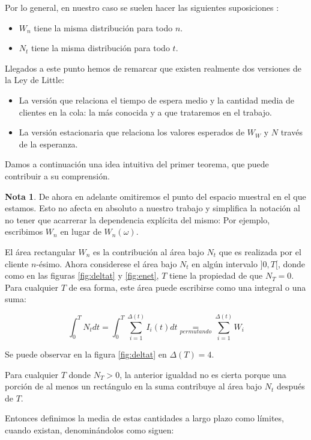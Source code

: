\documentclass[a4paper,10pt]{scrartcl}
\theoremstyle{definition}
\newtheorem*{rmk*}{Nota}
\numberwithin{equation}{section}
\begin{document}
Por lo general, en nuestro caso se suelen hacer las siguientes suposiciones :
\begin{itemize}
  \item $W_n$ tiene la misma distribución para todo $n$.
  \item $N_t$ tiene la misma distribución para todo $t$.
\end{itemize} 

Llegados a este punto hemos de remarcar que existen realmente dos versiones de la Ley de Little: 

\begin{itemize}
  \item La versión que relaciona el tiempo de espera medio y la cantidad media de clientes en la cola: 
  la más conocida y a que trataremos en el trabajo.
  \item La versión estacionaria que relaciona los valores esperados de $W_W$ y $N$ través de la esperanza. 
\end{itemize}

Damos a continuación una idea intuitiva del primer teorema, que puede contribuir a su comprensión.

\begin{rmk*}
De ahora en adelante omitiremos el punto del espacio muestral en el que estamos. Esto no afecta 
en absoluto a nuestro trabajo y simplifica la notación al no tener que acarrerar la dependencia 
explícita del mismo: Por ejemplo, escribimos $W_n$ en lugar de $W_n(\omega)$. 
\end{rmk*}

El área rectangular $W_n$ es la contribución al área bajo $N_t$ que es realizada por el cliente $n$-ésimo. 
Ahora considerese el área bajo $N_t$ en algún intervalo $]0,T[$, donde como en las figuras \ref{fig:deltat}
y \ref{fig:enet}, $T$ tiene la propiedad de que $N_T = 0$. Para cualquier $T$ de esa forma, este área puede 
escribirse como una integral o una suma:

\[\int_{0}^{T} N_t dt=\int_{0}^{T} \sum_{i=1}^{\Delta (t)} I_i(t) dt \underset{permutando}{=}\sum_{i=1}^{\Delta (t)} W_i\]

Se puede observar en la figura \ref{fig:deltat} en $\Delta(T) = 4$.

Para cualquier $T$ donde $N_T > 0$, la anterior igualdad no es cierta porque una porción de al menos un 
rectángulo en la suma contribuye al área bajo $N_t$ después de $T$. 

Entonces definimos la media de estas cantidades a largo plazo como límites, cuando existan, denominándolos
como siguen:
\end{document}
